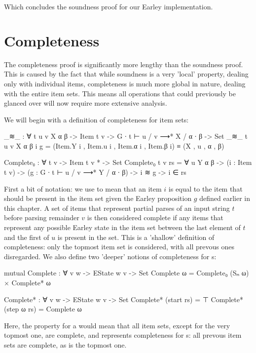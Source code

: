 		Which concludes the soundness proof for our Earley implementation.

	\section{Completeness}

		The completeness proof is significantly more lengthy than the soundness
		proof. This is caused by the fact that while soundness is a very
		'local' property, dealing only with individual items, completeness is
		much more global in nature, dealing with the entire item sets. This
		means all operations that could previously be glanced over will now
		require more extensive analysis.

		We will begin with a definition of completeness for item sets:

		\begin{code}
			_≋_ : ∀ {t u v X α β} -> Item t v -> G ∙ t ⊢ u / v ⟶* X / α ∙ β -> Set
			_≋_ {t} {u} {v} {X} {α} {β} i g =
			  (Item.Y i , Item.u i , Item.α i , Item.β i) ≡ (X , u , α , β)

			Complete₀ : ∀ {t v} -> Item t v * -> Set
			Complete₀ {t} {v} rs = ∀ {u Y α β} ->
			  (i : Item t v) ->
			  (g : G ∙ t ⊢ u / v ⟶* Y / α ∙ β) ->
			  i ≋ g ->
			  i ∈ rs
		\end{code}

		First a bit of notation: we use  to mean that an item $i$
		is equal to the item that should be present in the item set given the
		Earley proposition $g$ defined earlier in this chapter. A set of items
		that represent partial parses of an input string $t$ before parsing
		remainder $v$ is then considered complete if any items that represent
		any possible Earley state in the item set between the last element of
		$t$ and the first of $u$ is present in the set. This is a 'shallow'
		definition of completeness: only the topmost item set is considered,
		with all prevous ones disregarded. We also define two 'deeper' notions of
		completeness for s:

		\begin{code}
			mutual
			  Complete : ∀ {v w} -> EState w v -> Set
			  Complete ω = Complete₀ (Sₙ ω) × Complete* ω

			  Complete* : ∀ {v w} -> EState w v -> Set
			  Complete* (start rs) = ⊤
			  Complete* (step ω rs) = Complete ω
		\end{code}

		Here, the  property for a  would mean
		that all item sets, except for the very topmost one, are complete, and
		 represents completeness for s: all
		prevous item sets are complete, as is the topmost one.

